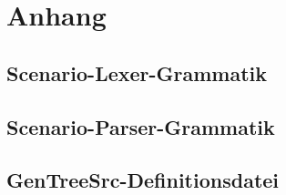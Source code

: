 \chapter{Anhang}\label{ch:appendix}

\section{Scenario-Lexer-Grammatik}\label{sec:scenario-lexer-grammar}

\section{Scenario-Parser-Grammatik}\label{sec:scenario-parser-grammar}

\section{GenTreeSrc-Definitionsdatei}\label{sec:gts-definitions}

